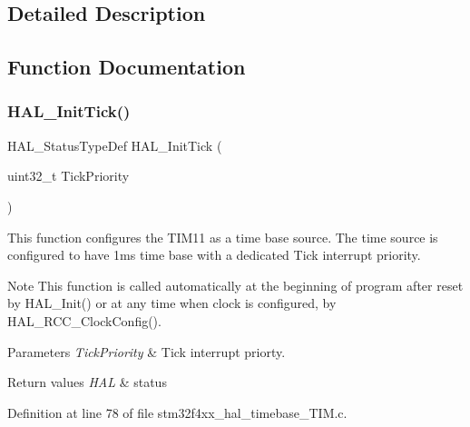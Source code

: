 \subsection{Detailed Description}


\subsection{Function Documentation}
\mbox{\label{group___h_a_l___time_base_ga879cdb21ef051eb81ec51c18147397d5}} 
\subsubsection{\texorpdfstring{H\+A\+L\+\_\+\+Init\+Tick()}{HAL\_InitTick()}}
{\footnotesize\ttfamily H\+A\+L\+\_\+\+Status\+Type\+Def H\+A\+L\+\_\+\+Init\+Tick (\begin{DoxyParamCaption}\item[{uint32\+\_\+t}]{Tick\+Priority }\end{DoxyParamCaption})}



This function configures the T\+I\+M11 as a time base source. The time source is configured to have 1ms time base with a dedicated Tick interrupt priority. 

\begin{DoxyNote}{Note}
This function is called automatically at the beginning of program after reset by H\+A\+L\+\_\+\+Init() or at any time when clock is configured, by H\+A\+L\+\_\+\+R\+C\+C\+\_\+\+Clock\+Config(). 
\end{DoxyNote}

\begin{DoxyParams}{Parameters}
{\em Tick\+Priority} & Tick interrupt priorty. \\
\hline
\end{DoxyParams}

\begin{DoxyRetVals}{Return values}
{\em H\+AL} & status \\
\hline
\end{DoxyRetVals}


Definition at line 78 of file stm32f4xx\+\_\+hal\+\_\+timebase\+\_\+\+T\+I\+M.\+c.



